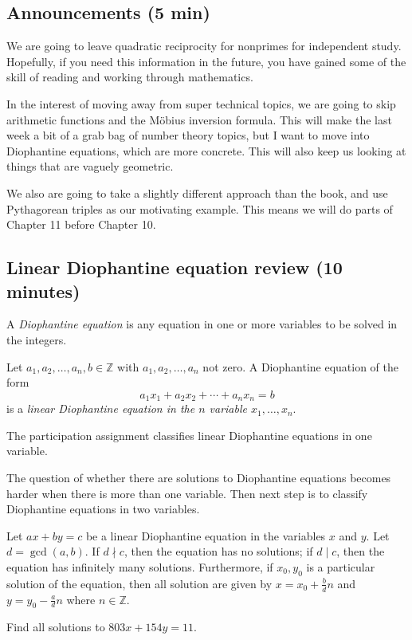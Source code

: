 \documentclass[letterpaper, 11 pt]{article}
\begin{document}
\subsection{Announcements (5 min)}
We are going to leave quadratic reciprocity for nonprimes for independent study. Hopefully, if you need this information in the future, you have gained some of the skill of reading and working through mathematics. 

In the interest of moving away from super technical topics, we are going to skip arithmetic functions and the M\"obius inversion formula. This will make the last week a bit of a grab bag of number theory topics, but I want to move into Diophantine equations, which are more concrete. This will also keep us looking at things that are vaguely geometric.

We also are going to take a slightly different approach than the book, and use Pythagorean triples as our motivating example. This means we will do parts of Chapter 11 before Chapter 10.


\subsection{Linear Diophantine equation review (10 minutes)}

\begin{defn}
 A \emph{Diophantine equation} is any equation in one or more variables to be solved in the integers.
\end{defn}
\begin{defn}
 Let $a_1,a_2,\dots,a_n,b\in\mathbb{Z}$ with $a_1,a_2,\dots,a_n$ not zero. A Diophantine equation of the form \[a_1x_1+a_2x_2+\cdots+a_nx_n=b\] is a \emph{linear Diophantine equation in the $n$ variable $x_1,\dots,x_n$}.
\end{defn}

The participation assignment classifies linear Diophantine equations in one variable.

The question of whether there are solutions to Diophantine equations becomes harder when there is more than one variable. Then next step is to classify Diophantine equations in two variables.

\begin{thm}[Theorem 1.13]
 Let $ax+by=c$ be a linear Diophantine equation in the variables $x$ and $y$. Let $d=\gcd(a,b)$. If $d\nmid c$, then the equation has no solutions; if $d\mid c$, then the equation has infinitely many solutions. Furthermore, if $x_0,y_0$ is a particular solution of the equation, then all solution are given by $x=x_0+\frac{b}{d}n$ and $y=y_0-\frac{a}{d}n$ where $n\in\mathbb{Z}$.
\end{thm}
\begin{br}[7 minutes]
Find all solutions to $803x+154y=11$.
\end{br}
\end{document}
